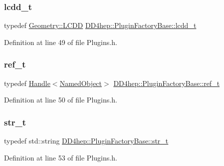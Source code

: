 \subsubsection{\texorpdfstring{lcdd\+\_\+t}{lcdd\_t}}
{\footnotesize\ttfamily typedef \hyperlink{class_d_d4hep_1_1_geometry_1_1_l_c_d_d}{Geometry\+::\+L\+C\+DD} \hyperlink{struct_d_d4hep_1_1_plugin_factory_base_a61b840cc18cdd24ae2e383da306b9c9a}{D\+D4hep\+::\+Plugin\+Factory\+Base\+::lcdd\+\_\+t}}



Definition at line 49 of file Plugins.\+h.

\hypertarget{struct_d_d4hep_1_1_plugin_factory_base_ab13458952a5b4a91f5130d3ee4db4d33}{}\label{struct_d_d4hep_1_1_plugin_factory_base_ab13458952a5b4a91f5130d3ee4db4d33} 
\subsubsection{\texorpdfstring{ref\+\_\+t}{ref\_t}}
{\footnotesize\ttfamily typedef \hyperlink{class_d_d4hep_1_1_handle}{Handle}$<$\hyperlink{class_d_d4hep_1_1_named_object}{Named\+Object}$>$ \hyperlink{struct_d_d4hep_1_1_plugin_factory_base_ab13458952a5b4a91f5130d3ee4db4d33}{D\+D4hep\+::\+Plugin\+Factory\+Base\+::ref\+\_\+t}}



Definition at line 50 of file Plugins.\+h.

\hypertarget{struct_d_d4hep_1_1_plugin_factory_base_aaa4c6d8801f70db2776c5473abc92692}{}\label{struct_d_d4hep_1_1_plugin_factory_base_aaa4c6d8801f70db2776c5473abc92692} 
\subsubsection{\texorpdfstring{str\+\_\+t}{str\_t}}
{\footnotesize\ttfamily typedef std\+::string \hyperlink{struct_d_d4hep_1_1_plugin_factory_base_aaa4c6d8801f70db2776c5473abc92692}{D\+D4hep\+::\+Plugin\+Factory\+Base\+::str\+\_\+t}}



Definition at line 53 of file Plugins.\+h.

